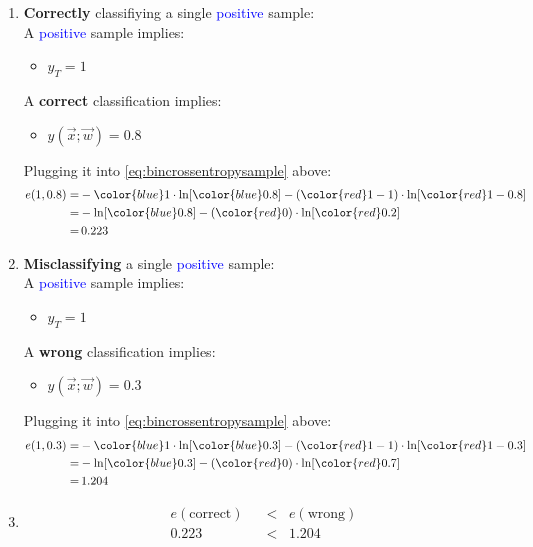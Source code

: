 \begin{enumerate}
\item \textbf{Correctly} classifiying a single \textcolor{blue}{positive} sample:\\
	A \textcolor{blue}{positive} sample implies:
	\begin{itemize}
	\item $y_T = 1$
	\end{itemize}
	A \textbf{correct} classification implies:
	\begin{itemize}
	\item $y(\vec x;\vec w) = 0.8$
	\end{itemize}
	Plugging it into \eqref{eq:bincrossentropysample} above:
	\begin{align}
	e(1, 0.8)
	=& 
	-
	{\color{blue}1} \cdot
		 \ln \lbrack {\color{blue}0.8} \rbrack
		 - ( {\color{red}1-1} ) \cdot
		 \ln \lbrack {\color{red}1-0.8} \rbrack\\
	=& 
	-
		 \ln \lbrack {\color{blue}0.8} \rbrack
		 - ( {\color{red}0} ) \cdot
		 \ln \lbrack {\color{red}0.2} \rbrack\\
	=&\,0.223
	\end{align}	
\item \textbf{Misclassifying} a single \textcolor{blue}{positive} sample:\\
	A \textcolor{blue}{positive} sample implies:
	\begin{itemize}
	\item $y_T = 1$
	\end{itemize}
	A \textbf{wrong} classification implies:
	\begin{itemize}
	\item $y(\vec x;\vec w) = 0.3$
	\end{itemize}
	Plugging it into \eqref{eq:bincrossentropysample} above:
	\begin{align}
	e(1, 0.3)
	=& 
	-
	{\color{blue}1} \cdot
		 \ln \lbrack {\color{blue}0.3} \rbrack
		 - ( {\color{red}1-1} ) \cdot
		 \ln \lbrack {\color{red}1-0.3} \rbrack\\
	=& -
		 \ln \lbrack {\color{blue}0.3} \rbrack
		 - ( {\color{red}0} ) \cdot
		 \ln \lbrack {\color{red}0.7} \rbrack\\
	=&\,1.204
	\end{align}	
\item[]
\begin{align}
e(\text{correct})
&\;\;<\;\;
e(\text{wrong})\\
		0.223
&\;\;<\;\;
		1.204
\end{align}
\end{enumerate}
